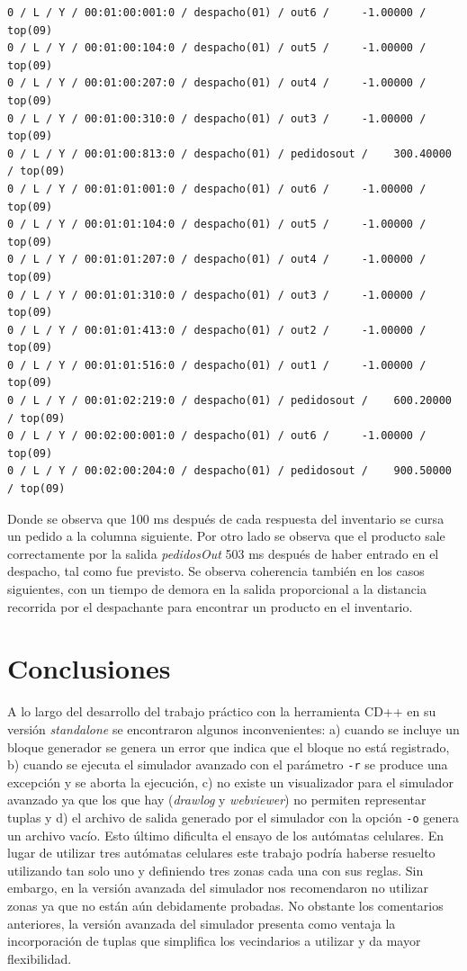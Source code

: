 \documentclass[10pt]{article}
\begin{document}
\begin{minipage}{1\textwidth}
	\centering
	\begin{lstlisting}
0 / L / Y / 00:01:00:001:0 / despacho(01) / out6 /     -1.00000 / top(09)
0 / L / Y / 00:01:00:104:0 / despacho(01) / out5 /     -1.00000 / top(09)
0 / L / Y / 00:01:00:207:0 / despacho(01) / out4 /     -1.00000 / top(09)
0 / L / Y / 00:01:00:310:0 / despacho(01) / out3 /     -1.00000 / top(09)
0 / L / Y / 00:01:00:813:0 / despacho(01) / pedidosout /    300.40000 / top(09)
0 / L / Y / 00:01:01:001:0 / despacho(01) / out6 /     -1.00000 / top(09)
0 / L / Y / 00:01:01:104:0 / despacho(01) / out5 /     -1.00000 / top(09)
0 / L / Y / 00:01:01:207:0 / despacho(01) / out4 /     -1.00000 / top(09)
0 / L / Y / 00:01:01:310:0 / despacho(01) / out3 /     -1.00000 / top(09)
0 / L / Y / 00:01:01:413:0 / despacho(01) / out2 /     -1.00000 / top(09)
0 / L / Y / 00:01:01:516:0 / despacho(01) / out1 /     -1.00000 / top(09)
0 / L / Y / 00:01:02:219:0 / despacho(01) / pedidosout /    600.20000 / top(09)
0 / L / Y / 00:02:00:001:0 / despacho(01) / out6 /     -1.00000 / top(09)
0 / L / Y / 00:02:00:204:0 / despacho(01) / pedidosout /    900.50000 / top(09)

	\end{lstlisting}	
\end{minipage}

Donde se observa que 100 ms después de cada respuesta del inventario se cursa un pedido a la columna siguiente. Por otro lado se observa que el producto sale correctamente por la salida \textit{pedidosOut} 503 ms después de haber entrado en el despacho, tal como fue previsto. Se observa coherencia también en los casos siguientes, con un tiempo de demora en la salida proporcional a la distancia recorrida por el despachante para encontrar un producto en el inventario.

\section{Conclusiones}

A lo largo del desarrollo del trabajo práctico con la herramienta CD++ en su versión \textit{standalone} se encontraron algunos inconvenientes: a) cuando se incluye un bloque generador se genera un error que indica que el bloque no está registrado, b) cuando se ejecuta el simulador avanzado con el parámetro \texttt{-r} se produce una excepción y se aborta la ejecución, c) no existe un visualizador para el simulador avanzado ya que los que hay (\textit{drawlog} y \textit{webviewer}) no permiten representar tuplas y d) el archivo de salida generado por el simulador con la opción \texttt{-o} genera un archivo vacío. Esto último dificulta el ensayo de los autómatas celulares. En lugar de utilizar tres autómatas celulares este trabajo podría haberse resuelto utilizando tan solo uno y definiendo tres zonas cada una con sus reglas. Sin embargo, en la versión avanzada del simulador nos recomendaron no utilizar zonas ya que no están aún debidamente probadas. No obstante los comentarios anteriores, la versión avanzada del simulador presenta como ventaja la incorporación de tuplas que simplifica los vecindarios a utilizar y da mayor flexibilidad.
\end{document}

